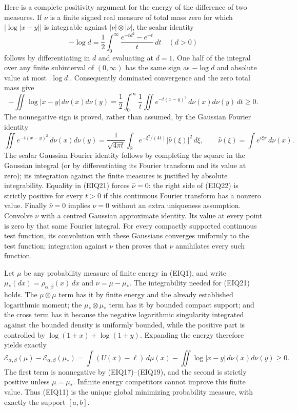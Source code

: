 Here is a complete positivity argument for the energy of the difference
of two measures.  If $\nu$ is a finite signed real measure of total mass
zero for which $|\log|x-y||$ is integrable against
$|\nu|\otimes|\nu|$, the scalar identity
\begin{equation}\tag{EIQ20}
 -\log d=\frac12\int_0^\infty
           \frac{e^{-td^2}-e^{-t}}t\,dt\quad(d>0)
\end{equation}
follows by differentiating in $d$ and evaluating at $d=1$.
One half of the integral over any finite subinterval of $(0,\infty)$
has the same sign as $-\log d$ and absolute value at most $|\log d|$.
Consequently dominated convergence and the zero total mass give
\begin{equation}\tag{EIQ21}
 -\iint\log|x-y|\,d\nu(x)d\nu(y)
 =\frac12\int_0^\infty\frac1t
       \iint e^{-t(x-y)^2}\,d\nu(x)d\nu(y)\,dt\geq0.
\end{equation}
The nonnegative sign is proved, rather than assumed, by the Gaussian
Fourier identity
\begin{equation}\tag{EIQ22}
 \iint e^{-t(x-y)^2}\,d\nu(x)d\nu(y)
 =\frac1{\sqrt{4\pi t}}\int_{\mathbb R}
          e^{-\xi^2/(4t)}|\widehat\nu(\xi)|^2\,d\xi,
 \qquad \widehat\nu(\xi)=\int e^{i\xi x}\,d\nu(x).
\end{equation}
The scalar Gaussian Fourier identity follows by completing the square
in the Gaussian integral (or by differentiating its Fourier transform
and its value at zero); its integration against the finite measures is
justified by absolute integrability.  Equality in (EIQ21) forces
$\widehat\nu=0$: the right side of (EIQ22) is strictly positive for every
$t>0$ if this continuous Fourier transform has a nonzero value.
Finally $\widehat\nu=0$ implies $\nu=0$ without an extra uniqueness
assumption. Convolve $\nu$ with a centred Gaussian approximate identity.
Its value at every point is zero by that same Fourier integral.
For every compactly supported continuous test function, its convolution
with these Gaussians converges uniformly to the test function; integration
against $\nu$ then proves that $\nu$ annihilates every such function.

Let $\mu$ be any probability measure of finite energy in (EIQ1), and
write $\mu_*(dx)=\rho_{\alpha,\beta}(x)\,dx$ and $\nu=\mu-\mu_*$.
The integrability needed for (EIQ21) holds.  The $\mu\otimes\mu$ term
has it by finite energy and the already established logarithmic moment;
the $\mu_*\otimes\mu_*$ term has it by bounded compact support; and the
cross term has it because the negative logarithmic singularity integrated
against the bounded density is uniformly bounded, while the positive
part is controlled by $\log(1+x)+\log(1+y)$.
Expanding the energy therefore yields exactly
\begin{equation}\tag{EIQ23}
 \mathcal E_{\alpha,\beta}(\mu)-
       \mathcal E_{\alpha,\beta}(\mu_*)
 =\int(U(x)-\ell)\,d\mu(x)
       -\iint\log|x-y|\,d\nu(x)d\nu(y)\geq0.
\end{equation}
The first term is nonnegative by (EIQ17)--(EIQ19), and the second is
strictly positive unless $\mu=\mu_*$. Infinite energy competitors cannot
improve this finite value. Thus (EIQ11) is the unique global minimizing
probability measure, with exactly the support $[a,b]$.


